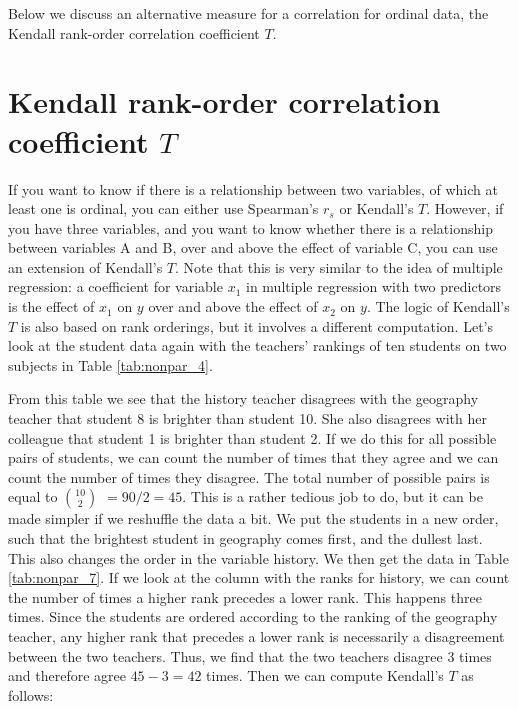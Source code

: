 Below we discuss an alternative measure for a correlation for ordinal data, the Kendall rank-order correlation coefficient $T$. 


\section{Kendall rank-order correlation coefficient $T$}


If you want to know if there is a relationship between two variables, of which at least one is ordinal, you can either use Spearman's $r_s$ or Kendall's $T$. However, if you have three variables, and you want to know whether there is a relationship between variables A and B, over and above the effect of variable C, you can use an extension of Kendall's $T$. Note that this is very similar to the idea of multiple regression: a coefficient for variable $x_1$ in multiple regression with two predictors is the effect of $x_1$ on $y$ over and above the effect of $x_2$ on $y$. The logic of Kendall's $T$ is also based on rank orderings, but it involves a different computation. Let's look at the student data again with the teachers' rankings of ten students on two subjects in Table \ref{tab:nonpar_4}. 


\begin{kframe}


{\ttfamily\noindent\bfseries{}}\end{kframe}

From this table we see that the history teacher disagrees with the geography teacher that student 8 is brighter than student 10. She also disagrees with her colleague that student 1 is brighter than student 2. If we do this for all possible pairs of students, we can count the number of times that they agree and we can count the number of times they disagree. The total number of possible pairs is equal to $10 \choose 2 $ $ = 90/2= 45$. This is a rather tedious job to do, but it can be made simpler if we reshuffle the data a bit. We put the students in a new order, such that the brightest student in geography comes first, and the dullest last. This also changes the order in the variable history. We then get the data in Table \ref{tab:nonpar_7}. If we look at the column with the ranks for history, we can count the number of times a higher rank precedes a lower rank. This happens three times. Since the students are ordered according to the ranking of the geography teacher, any higher rank that precedes a lower rank is necessarily a disagreement between the two teachers. Thus, we find that the two teachers disagree 3 times and therefore agree $45-3=42$ times. Then we can compute Kendall's $T$ as follows:
 
